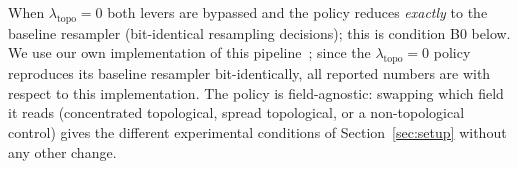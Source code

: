 When $\lambda_{\text{topo}}=0$ both levers are bypassed and the policy reduces
\emph{exactly} to the baseline resampler (bit-identical resampling decisions);
this is condition B0 below. We use our own implementation of this
pipeline~\cite{tojo2026diffsoup}; since the $\lambda_{\text{topo}}{=}0$ policy
reproduces its baseline resampler bit-identically, all reported numbers are with
respect to this implementation. The policy is field-agnostic: swapping which field it
reads (concentrated topological, spread topological, or a non-topological control)
gives the different experimental conditions of Section~\ref{sec:setup} without any
other change.

